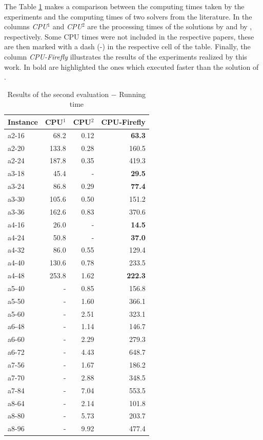 \documentclass[tuberlin,cic,tc,openright,english,noabntcite,oneside]{iiufrgs}
\begin{document}
The Table \ref{tab:evaluation-2.2} makes a comparison between the computing times taken by the experiments and the computing times of two solvers from the literature. In the columns \emph{CPU$^1$} and \emph{CPU$^2$} are the processing times of the solutions by \textcite{parragh_introducing_2011} and by \textcite{parragh_hybrid_2013}, respectively. Some CPU times were not included in the respective papers, these are then marked with a dash (-) in the respective cell of the table. Finally, the column \emph{CPU-Firefly} illustrates the results of the experiments realized by this work. In bold are highlighted the ones which executed faster than the solution of \textcite{parragh_introducing_2011}.
\begin{table}[H]
\centering
\caption{Results of the second evaluation $-$ Running time}
\begin{tabular}{l | r | r | r}
\hline
Instance & CPU$^1$ & CPU$^2$ & CPU-Firefly\\
\hline
a2-16 & 	68.2 	& 	0.12 & 	\textbf{63.3} \\
a2-20 & 	133.8 	& 	0.28 & 	160.5 \\
a2-24 & 	187.8 	& 	0.35 & 	419.3 \\
a3-18 & 	45.4 	& 	- & 	\textbf{29.5} \\
a3-24 & 	86.8 	& 	0.29 & 	\textbf{77.4} \\
a3-30 & 	105.6 	& 	0.50 & 	151.2 \\
a3-36 & 	162.6 	& 	0.83 & 	370.6 \\
a4-16 & 	26.0 	& 	- & 	\textbf{14.5} \\
a4-24 & 	50.8 	& 	- & 	\textbf{37.0} \\
a4-32 & 	86.0 		& 	0.55 & 	129.4 \\
a4-40 & 	130.6 	& 	0.78 & 	233.5 \\
a4-48 & 	253.8 	& 	1.62 & 	\textbf{222.3} \\
a5-40 & 	- & 	0.85 & 	156.8 \\
a5-50 & 	- & 	1.60 & 	366.1 \\
a5-60 & 	- & 	2.51 & 	323.1 \\
a6-48 & 	- & 	1.14 & 	146.7 \\
a6-60 & 	- & 	2.29 & 	279.3 \\
a6-72 & 	- & 	4.43 & 	648.7 \\
a7-56 & 	- & 	1.67 & 	186.2 \\
a7-70 & 	- & 	2.88 & 	348.5 \\
a7-84 & 	- & 	7.04 & 	553.5 \\
a8-64 & 	- & 	2.14 & 	101.8 \\
a8-80 & 	- & 	5.73 & 	203.7 \\
a8-96 & 	- & 	9.92 & 	477.4 \\
\hline
\end{tabular}
\label{tab:evaluation-2.2}
\end{table}
\end{document}
